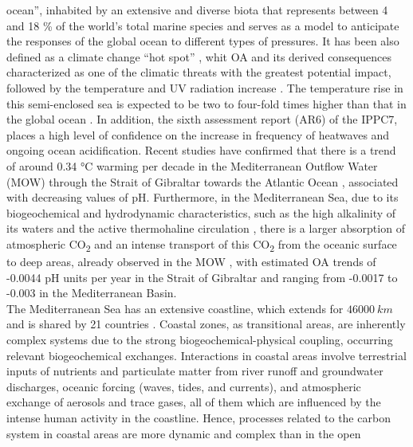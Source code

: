 ocean”\cite{bethoux1999mediterranean}, inhabited by an extensive and diverse
biota that represents between 4 and 18 \% of the world's total marine species
\cite{Bianchi2000} and serves as a model\cite{bethoux1999mediterranean} to
anticipate the responses of the global ocean to different types of pressures.
It has been also defined as a climate change ``hot spot'' \cite{Giorgi2006},
whit OA and its derived consequences characterized as one of the climatic
threats with the greatest potential impact, followed by the temperature and UV
radiation increase \cite{micheli2013}. The temperature rise in this
semi-enclosed sea is expected to be two to four-fold times higher than that in
the global ocean \cite{vargas2008w, vargas2010}. In addition, the sixth
assessment report (AR6) of the IPPC7, places a high level of confidence on the
increase in frequency of heatwaves and ongoing ocean
acidification\cite{Masson-Delmotte2021}. Recent studies have confirmed that
there is a trend of around 0.34 °C warming per decade in the Mediterranean
Outflow Water (MOW) through the Strait of Gibraltar towards the Atlantic Ocean
\cite{Garcia-Lafuente2021}, associated with decreasing values of pH.
Furthermore, in the Mediterranean Sea, due to its biogeochemical and
hydrodynamic characteristics, such as the high alkalinity of its waters and the
active thermohaline circulation \cite{Alvarez2014}, there is a larger
absorption of atmospheric CO\textsubscript{2} and an intense transport of this
CO\textsubscript{2} from the oceanic surface to deep
areas\cite{Hassoun2015,Palmieri2015}, already observed in the MOW
\cite{Flecha2015,Flecha2019}, with estimated OA trends of -0.0044 pH units per
year in the Strait of Gibraltar \cite{Flecha2015} and ranging from -0.0017 to
-0.003 in the Mediterranean Basin\cite{Kapsenberg2017,yao2016}.\\
The Mediterranean Sea has an extensive coastline, which extends for
$\SI{46000}{km}$ and is shared by 21 countries \cite{EEA1999}. Coastal zones,
as transitional areas, are inherently complex systems due to the strong
biogeochemical-physical coupling, occurring relevant biogeochemical exchanges.
Interactions in coastal areas involve terrestrial inputs of nutrients and
particulate matter from river runoff and groundwater discharges, oceanic
forcing (waves, tides, and currents), and atmospheric exchange of aerosols and
trace gases, all of them which are influenced by the intense human activity in
the coastline\cite{crossland2005coastal}. Hence, processes related to the
carbon system in coastal areas are more dynamic and complex than in the open
